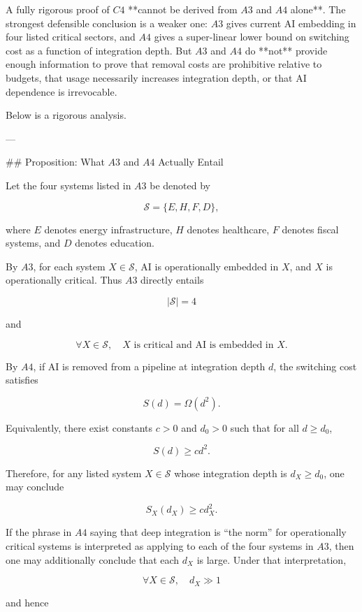 A fully rigorous proof of \(C4\) **cannot be derived from \(A3\) and \(A4\) alone**. The strongest defensible conclusion is a weaker one: \(A3\) gives current AI embedding in four listed critical sectors, and \(A4\) gives a super-linear lower bound on switching cost as a function of integration depth. But \(A3\) and \(A4\) do **not** provide enough information to prove that removal costs are prohibitive relative to budgets, that usage necessarily increases integration depth, or that AI dependence is irrevocable.

Below is a rigorous analysis.

---

## Proposition: What \(A3\) and \(A4\) Actually Entail

Let the four systems listed in \(A3\) be denoted by

\[
\mathcal{S}
=
\{E,H,F,D\},
\]

where \(E\) denotes energy infrastructure, \(H\) denotes healthcare, \(F\) denotes fiscal systems, and \(D\) denotes education.

By \(A3\), for each system \(X \in \mathcal{S}\), AI is operationally embedded in \(X\), and \(X\) is operationally critical. Thus \(A3\) directly entails

\[
|\mathcal{S}| = 4
\]

and

\[
\forall X \in \mathcal{S}, \quad X \text{ is critical and AI is embedded in } X.
\]

By \(A4\), if AI is removed from a pipeline at integration depth \(d\), the switching cost satisfies

\[
S(d) = \Omega(d^2).
\]

Equivalently, there exist constants \(c>0\) and \(d_0>0\) such that for all \(d \ge d_0\),

\[
S(d) \ge c d^2.
\]

Therefore, for any listed system \(X \in \mathcal{S}\) whose integration depth is \(d_X \ge d_0\), one may conclude

\[
S_X(d_X) \ge c d_X^2.
\]

If the phrase in \(A4\) saying that deep integration is “the norm” for operationally critical systems is interpreted as applying to each of the four systems in \(A3\), then one may additionally conclude that each \(d_X\) is large. Under that interpretation,

\[
\forall X \in \mathcal{S}, \quad d_X \gg 1
\]

and hence

